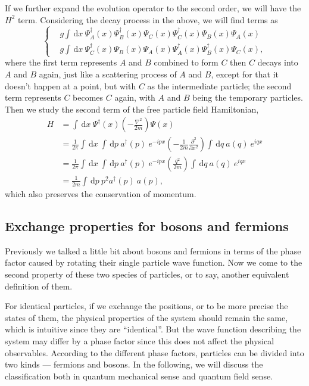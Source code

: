 \documentclass{article}
\newcommand{\be}{\begin{equation}}
\newcommand{\ee}{\end{equation}}
\newcommand{\dif}{\,\mathrm{d}}
\newcommand{\p}{\partial}
\renewcommand{\1}{\left}
\renewcommand{\2}{\right}
\begin{document}
If we further expand the evolution operator to the second order, we will have the $H^2$ term. Considering the decay process in the above, we will find terms as
\be\1\{\begin{split}
&g\int\dif x\ \Psi_A^\dag(x)\Psi_B^\dag(x)\Psi_C(x)\Psi_C^\dag(x)\Psi_B(x)\Psi_A(x)\\
&g\int\dif x\ \Psi_C^\dag(x)\Psi_B(x)\Psi_A(x)\Psi_A^\dag(x)\Psi_B^\dag(x)\Psi_C(x),
\end{split}\2.\ee
where the first term represents $A$ and $B$ combined to form $C$ then $C$ decays into $A$ and $B$ again, just like a scattering process of $A$ and $B$, except for that it doesn't happen at a point, but with $C$ as the intermediate particle; the second term represents $C$ becomes $C$ again, with $A$ and $B$ being the temporary particles.\\

Then we study the second term of the free particle field Hamiltonian,
\be\begin{split}
H&=\int\dif x\ \Psi^\dag(x)  \1(-\frac{\nabla^2}{2m}\2)\Psi(x)\\
&=\frac 1 {2\pi}\int\dif x\ \int\dif p\   a^\dag(p) \ e^{-ipx} \1(-\frac{1}{2m}\frac{\p^2}{\p x^2}\2)\int\dif q\ a(q)\ e^{iqx}\\
&=\frac 1 {2\pi}\int\dif x\ \int\dif p\   a^\dag(p) \ e^{-ipx} \1(\frac{q^2}{2m}\2)\int\dif q\ a(q)\ e^{iqx}\\
&=\frac{1}{2m}\int\dif p\ p^2a^\dag(p)\ a(p),
\end{split}\ee
which also preserves the conservation of momentum.

\subsection{Exchange properties for bosons and fermions}
Previously we talked a little bit about bosons and fermions in terms of the phase factor caused by rotating their single particle wave function. Now we come to the second property of these two species of particles, or to say, another equivalent definition of them.

For identical particles, if we exchange the positions, or to be more precise the states of them, the physical properties of the system should remain the same, which is intuitive since they are ``identical''. But the wave function describing the system may differ by a phase factor since this does not affect the physical observables. According to the different phase factors, particles can be divided into two kinds --- fermions and bosons. In the following, we will discuss the classification both in quantum mechanical sense and quantum field sense.\\
\end{document}
